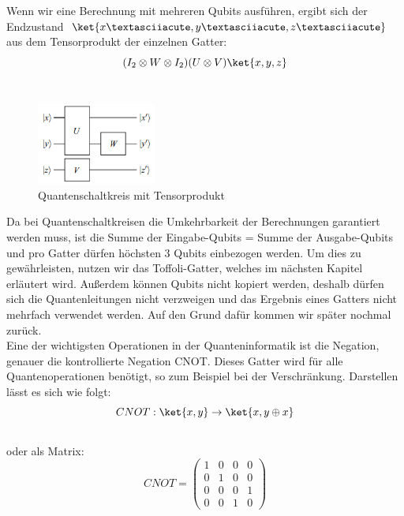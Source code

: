 Wenn wir eine Berechnung mit mehreren Qubits ausführen, ergibt sich der Endzustand $\ket{x´, y´, z´}$ aus dem Tensorprodukt der einzelnen Gatter:\\
\begin{equation}
    (I_{2} \otimes W \otimes I_{2})(U \otimes V)\ket{x, y, z}
\end{equation}\\

\begin{figure}[H]
    \centering
    \includegraphics[width=0.35\textwidth]{img/Quantengatter 3er}
    \caption{Quantenschaltkreis mit Tensorprodukt}
    \label{fig:quantenschaltkreis-tensorprodukt}
\end{figure}

Da bei Quantenschaltkreisen die Umkehrbarkeit der Berechnungen garantiert werden muss, ist die Summe der Eingabe-Qubits = Summe der Ausgabe-Qubits und pro Gatter dürfen höchsten 3 Qubits einbezogen werden.
Um dies zu gewährleisten, nutzen wir das Toffoli-Gatter, welches im nächsten Kapitel erläutert wird.
Außerdem können Qubits nicht kopiert werden, deshalb dürfen sich die Quantenleitungen nicht verzweigen und das Ergebnis eines Gatters nicht mehrfach verwendet werden.
Auf den Grund dafür kommen wir später nochmal zurück.\\

Eine der wichtigsten Operationen in der Quanteninformatik ist die Negation, genauer die kontrollierte Negation CNOT\@.
Dieses Gatter wird für alle Quantenoperationen benötigt, so zum Beispiel bei der Verschränkung.
Darstellen lässt es sich wie folgt:\\
\begin{equation}
    CNOT : \ket{x,y} \rightarrow \ket{x,y\oplus x}
\end{equation}\\

oder als Matrix:\\
\begin{equation}
    CNOT =
    \begin{pmatrix}
        1 & 0 & 0 & 0 \\
        0 & 1 & 0 & 0 \\
        0 & 0 & 0 & 1 \\
        0 & 0 & 1 & 0
    \end{pmatrix}
\end{equation}\\

